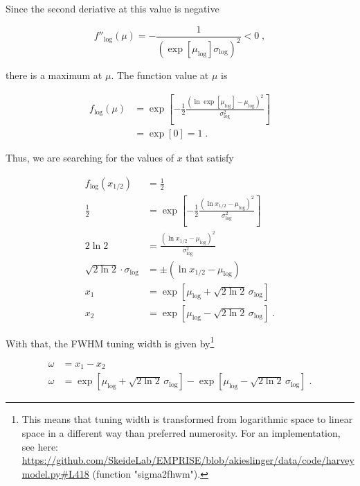 \documentclass[a4paper,12pt]{article}
\begin{document}
Since the second deriative at this value is negative

\begin{equation} \label{eq:d2f-log-mu}
f''_\mathrm{log}(\mu) = -\frac{1}{\left( \exp \left[ \mu_\mathrm{log} \right] \sigma_\mathrm{log} \right)^2} < 0 \; ,
\end{equation}

there is a maximum at $\mu$. The function value at $\mu$ is

\begin{equation} \label{eq:f-log-mu}
\begin{split}
f_\mathrm{log}(\mu) &= \exp \left[ -\frac{1}{2} \frac{(\ln \exp \left[ \mu_\mathrm{log} \right] - \mu_\mathrm{log})^2}{\sigma_\mathrm{log}^2} \right] \\
&= \exp \left[ 0 \right] = 1 \; .
\end{split}
\end{equation}

\pagebreak
Thus, we are searching for the values of $x$ that satisfy

\vspace{-0.5em}
\begin{equation} \label{eq:fwhm-x12}
\begin{split}
f_\mathrm{log}(x_{1/2}) &= \frac{1}{2} \\
\frac{1}{2} &= \exp \left[ -\frac{1}{2} \frac{(\ln x_{1/2} - \mu_\mathrm{log})^2}{\sigma_\mathrm{log}^2} \right] \\
2 \ln 2 &= \frac{(\ln x_{1/2} - \mu_\mathrm{log})^2}{\sigma_\mathrm{log}^2} \\
\sqrt{2 \ln 2} \cdot \sigma_\mathrm{log} &= \pm (\ln x_{1/2} - \mu_\mathrm{log}) \\
x_1 &= \exp \left[ \mu_\mathrm{log} + \sqrt{2 \ln 2} \, \sigma_\mathrm{log} \right] \\
x_2 &= \exp \left[ \mu_\mathrm{log} - \sqrt{2 \ln 2} \, \sigma_\mathrm{log} \right] \; .
\end{split}
\end{equation}

With that, the FWHM tuning width is given by\footnote{This means that tuning width is transformed from logarithmic space to linear space in a different way than preferred numerosity. For an implementation, see here: \url{https://github.com/SkeideLab/EMPRISE/blob/akieslinger/data/code/harveymodel.py#L418} (function "sigma2fhwm").} 

\vspace{-0.5em}
\begin{equation} \label{eq:fwhm-qed}
\begin{split}
\omega &= x_1 - x_2 \\
\omega &= \exp \left[ \mu_\mathrm{log} + \sqrt{2 \ln 2} \, \sigma_\mathrm{log} \right] - \exp \left[ \mu_\mathrm{log} - \sqrt{2 \ln 2} \, \sigma_\mathrm{log} \right] \; .
\end{split}
\end{equation}
\end{document}
